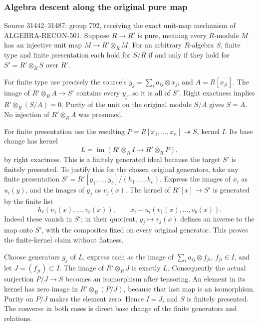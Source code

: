 \subsubsection{Algebra descent along the original pure map}\label{algebra-proof-035-algebra-descent-along-the-original-pure-map}

Source 31442--31487; group 792, receiving the exact unit-map mechanism of ALGEBRA-RECON-501. Suppose \(R\to R'\) is pure, meaning every \(R\)-module \(M\) has an injective unit map \(M\to R'\otimes_R M\). For an arbitrary \(R\)-algebra \(S\), finite type and finite presentation each hold for \(S/R\) if and only if they hold for \(S'=R'\otimes_R S\) over \(R'\).

For finite type use precisely the source's \(y_j=\sum_i a_{ij}\otimes x_{ji}\) and \(A=R[x_{ji}]\). The image of \(R'\otimes_R A\to S'\) contains every \(y_j\), so it is all of \(S'\). Right exactness implies \(R'\otimes_R(S/A)=0\). Purity of the unit on the original module \(S/A\) gives \(S=A\). No injection of \(R'\otimes_R A\) was presumed.

For finite presentation use the resulting \(P=R[x_1,\ldots,x_n]\twoheadrightarrow S\), kernel \(I\). Its base change has kernel \[
L=\operatorname{im}(R'\otimes_R I\to R'\otimes_R P),
\] by right exactness. This is a finitely generated ideal because the target \(S'\) is finitely presented. To justify this for the chosen original generators, take any finite presentation \(S'=R'[y_1,\ldots,y_b]/(h_1,\ldots,h_c)\). Express the images of \(x_i\) as \(u_i(y)\), and the images of \(y_j\) as \(v_j(x)\). The kernel of \(R'[x]\to S'\) is generated by the finite list \[
h_\ell(v_1(x),\ldots,v_b(x)),\qquad x_i-u_i(v_1(x),\ldots,v_b(x)).
\] Indeed these vanish in \(S'\); in their quotient, \(y_j\mapsto v_j(x)\) defines an inverse to the map onto \(S'\), with the composites fixed on every original generator. This proves the finite-kernel claim without flatness.

Choose generators \(g_j\) of \(L\), express each as the image of \(\sum_i a_{ij}\otimes f_{ji}\), \(f_{ji}\in I\), and let \(J=(f_{ji})\subset I\). The image of \(R'\otimes_R J\) is exactly \(L\). Consequently the actual surjection \(P/J\to S\) becomes an isomorphism after tensoring. An element in its kernel has zero image in \(R'\otimes_R(P/J)\), because that last map is an isomorphism. Purity on \(P/J\) makes the element zero. Hence \(I=J\), and \(S\) is finitely presented. The converse in both cases is direct base change of the finite generators and relations.

